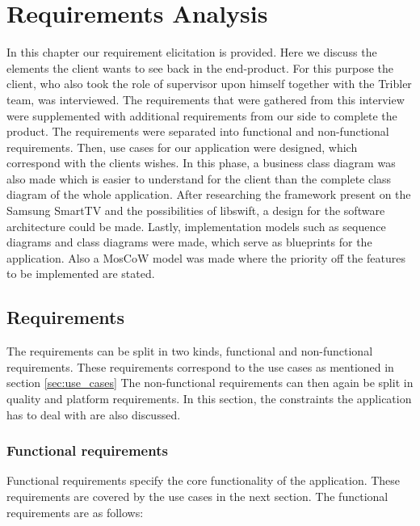 \chapter{Requirements Analysis}
\label{sec:requirements}
In this chapter our requirement elicitation is provided. Here we discuss the elements the client wants to see back in the end-product. For this purpose the client, who also took the role of supervisor upon himself together with the Tribler team, was interviewed. The requirements that were gathered from this interview were supplemented with additional requirements from our side to complete the product. The requirements were separated into functional and non-functional requirements. Then, use cases for our application were designed, which correspond with the clients wishes. In this phase, a business class diagram was also made which is easier to understand for the client than the complete class diagram of the whole application. 
After researching the framework present on the Samsung SmartTV and the possibilities of libswift, a design for the software architecture could be made. 
Lastly, implementation models such as sequence diagrams and class diagrams were made, which serve as blueprints for the application. Also a MosCoW model was made where the priority off the features to be implemented are stated.

\section{Requirements}
The requirements can be split in two kinds, functional and non-functional requirements. These requirements  correspond to the use cases as mentioned in section \hyperref[sec:use_cases]{\ref*{sec:use_cases}} The non-functional requirements can then again be split in quality and platform requirements. In this section, the constraints the application has to deal with are also discussed.

\subsection{Functional requirements}
Functional requirements specify the core functionality of the application. These requirements are covered by the use cases in the next section. The functional requirements are as follows:

